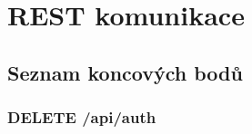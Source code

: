 
\section{REST komunikace}\label{sec:restKomunikace}

\subsection{Seznam koncových bodů}\label{subsec:seznamKoncovýchBodů}

\subsubsection{DELETE /api/auth}

